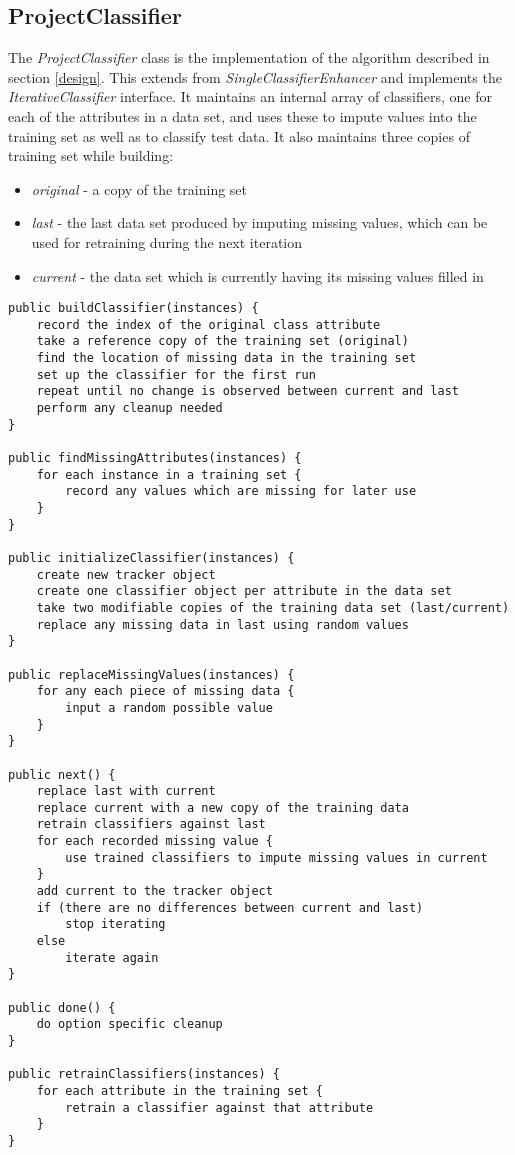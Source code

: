 \subsection{ProjectClassifier}
\label{project_class}
The \textit{ProjectClassifier} class is the implementation of the algorithm described in section \ref{design}. This extends from \textit{SingleClassifierEnhancer} and implements the \textit{IterativeClassifier} interface. It maintains an internal array of classifiers, one for each of the attributes in a data set, and uses these to impute values into the training set as well as to classify test data. It also maintains three copies of training set while building:

\begin{itemize}
\item \textit{original} - a copy of the training set
\item \textit{last} - the last data set produced by imputing missing values, which can be used for retraining during the next iteration
\item \textit{current} - the data set which is currently having its missing values filled in
\end{itemize}

\begin{footnotesize}
\begin{verbatim}
public buildClassifier(instances) {
    record the index of the original class attribute
    take a reference copy of the training set (original)
    find the location of missing data in the training set
    set up the classifier for the first run
    repeat until no change is observed between current and last
    perform any cleanup needed
}

public findMissingAttributes(instances) {
    for each instance in a training set {
        record any values which are missing for later use
    }
}

public initializeClassifier(instances) {
    create new tracker object
    create one classifier object per attribute in the data set
    take two modifiable copies of the training data set (last/current)
    replace any missing data in last using random values
}

public replaceMissingValues(instances) {
    for any each piece of missing data {
        input a random possible value
    }
}

public next() {
    replace last with current
    replace current with a new copy of the training data
    retrain classifiers against last
    for each recorded missing value {
        use trained classifiers to impute missing values in current
    }
    add current to the tracker object
    if (there are no differences between current and last)
        stop iterating
    else   
        iterate again
}

public done() {
    do option specific cleanup
}

public retrainClassifiers(instances) {
    for each attribute in the training set {
        retrain a classifier against that attribute
    }
}
\end{verbatim}
\end{footnotesize}

